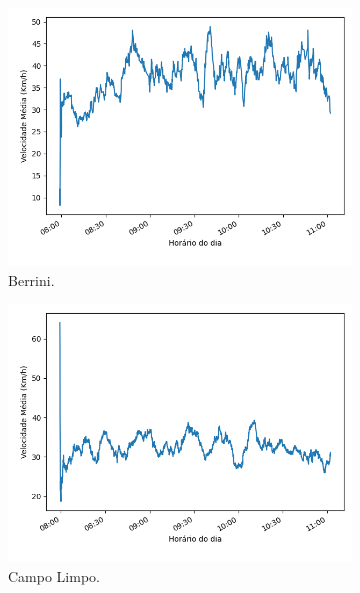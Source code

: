 \begin{figure}
\centering
\begin{subfigure}{.5\textwidth}
  \centering
  \includegraphics[width=\textwidth]{figuras/detect_graphics/avg_speed_7-dez-su-corr_Berrini.png}
  \caption{Berrini.}
  \label{fig:avg_speed_Berrini}
\end{subfigure}%
\begin{subfigure}{.5\textwidth}
  \centering
  \includegraphics[width=\textwidth]{figuras/detect_graphics/avg_speed_7-dez-su-corr_CampoLimpo.png}
  \caption{Campo Limpo.}
  \label{fig:avg_speed_Campo Limpo}
\end{subfigure}
\centering
\begin{subfigure}{.5\textwidth}

\end{subfigure}
\end{figure}
